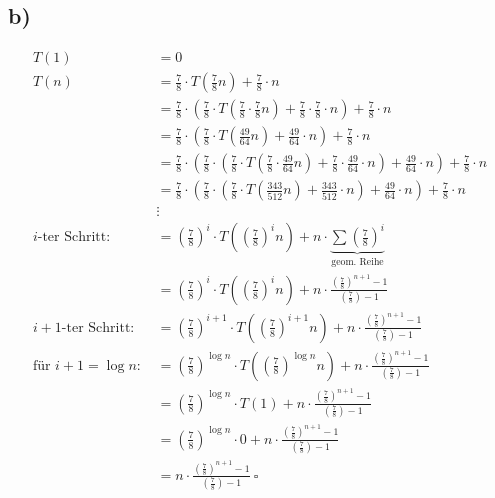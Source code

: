 \documentclass[a4paper]{scrartcl}
\begin{document}
\subsection*{b)}
\begin{align*}
T(1) & = 0 \\
T(n) & = \frac{7}{8} \cdot T\left( \frac{7}{8} n \right) + \frac{7}{8} \cdot n \\
& = \frac{7}{8} \cdot \left( \frac{7}{8} \cdot T\left(\frac{7}{8} \cdot \frac{7}{8} n \right) + \frac{7}{8} \cdot \frac{7}{8} \cdot n \right) + \frac{7}{8} \cdot n \\
& = \frac{7}{8} \cdot \left( \frac{7}{8} \cdot T\left(\frac{49}{64} n \right) + \frac{49}{64} \cdot n \right) + \frac{7}{8} \cdot n \\
& = \frac{7}{8} \cdot \left( \frac{7}{8} \cdot \left( \frac{7}{8} \cdot T\left(\frac{7}{8} \cdot \frac{49}{64} n \right) + \frac{7}{8} \cdot \frac{49}{64} \cdot n \right) + \frac{49}{64} \cdot n \right) + \frac{7}{8} \cdot n \\
& = \frac{7}{8} \cdot \left( \frac{7}{8} \cdot \left( \frac{7}{8} \cdot T\left(\frac{343}{512} n \right) + \frac{343}{512} \cdot n \right) + \frac{49}{64} \cdot n \right) + \frac{7}{8} \cdot n \\
& \vdots \\
i \text{-ter Schritt: } & = \left( \frac{7}{8} \right)^i \cdot T\left(\left(  \frac{7}{8} \right)^i n \right) + n \cdot \underbrace{ \sum \left(  \frac{7}{8} \right)^i}_{\text{geom. Reihe}} \\
& = \left( \frac{7}{8} \right)^i \cdot T\left(\left(  \frac{7}{8} \right)^i n \right) + n \cdot \frac{\left(  \frac{7}{8} \right)^{n+1} - 1}{\left(  \frac{7}{8} \right) - 1} \\
i+1 \text{-ter Schritt: } & = \left( \frac{7}{8} \right)^{i+1} \cdot T\left(\left(  \frac{7}{8} \right)^{i+1} n \right) + n \cdot \frac{\left(  \frac{7}{8} \right)^{n+1} - 1}{\left(  \frac{7}{8} \right) - 1} \\
\text{für } i+1 = \log n \text{: } & = \left( \frac{7}{8} \right)^{\log n} \cdot T\left(\left(  \frac{7}{8} \right)^{\log n} n \right) + n \cdot \frac{\left(  \frac{7}{8} \right)^{n+1} - 1}{\left(  \frac{7}{8} \right) - 1} \\
& = \left( \frac{7}{8} \right)^{\log n} \cdot T\left(1 \right) + n \cdot \frac{\left(  \frac{7}{8} \right)^{n+1} - 1}{\left(  \frac{7}{8} \right) - 1} \\
& = \left( \frac{7}{8} \right)^{\log n} \cdot 0 + n \cdot \frac{\left(  \frac{7}{8} \right)^{n+1} - 1}{\left(  \frac{7}{8} \right) - 1} \\
& = n \cdot \frac{\left(  \frac{7}{8} \right)^{n+1} - 1}{\left(  \frac{7}{8} \right) - 1} ~ \square
\end{align*}
\end{document}

